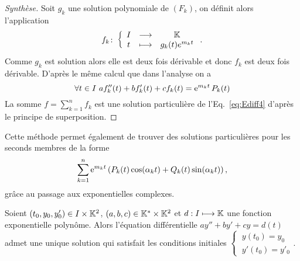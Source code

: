 \begin{proof}[Synthèse]
Soit $g_k$ une solution polynomiale de $(F_k)$, on définit alors l'application
\begin{equation}
  f_k\colon \left\{\begin{array}{ccc} I & \longrightarrow &\mathbb{K}\\ t & \longmapsto & g_k(t)e^{m_k t} \end{array} \right..
\end{equation}
Comme $g_k$ est solution alors elle est deux fois dérivable et donc $f_k$ est deux fois dérivable. D'après le même calcul que dans l'analyse on a
  \begin{equation}
    \forall t \in I \ af_k''(t)+bf_k'(t)+cf_k(t)=\e^{m_k t} P_k(t)
  \end{equation}
La somme $f=\sum_{k=1}^n f_k$ est une solution particulière de l'Eq.~\eqref{eq:Ediff4} d'après le principe de superposition.
\end{proof}
%
Cette méthode permet également de trouver des solutions particulières pour les seconds membres de la forme
\begin{equation}
\sum_{k=1}^n \operatorname{e}^{m_k t} \left( P_k(t) \cos(\alpha_k t) +Q_k(t)\sin(\alpha_kt)\right),
\end{equation}
grâce au passage aux exponentielles complexes.
%
\begin{theo}
Soient $(t_0,y_0,y'_0) \in I \times \mathbb{K}^2$, $(a,b,c) \in \mathbb{K}^{*} \times \mathbb{K}^2$ et $d: I \longmapsto \mathbb{K}$ une fonction exponentielle polynôme. Alors l'équation différentielle $ay''+by'+cy=d(t)$ admet une unique solution qui satisfait les conditions initiales $ \left\{~\begin{array}{l} y(t_0)=y_0 \\ y'(t_0)=y'_0 \end{array}\right.$.
\end{theo}
